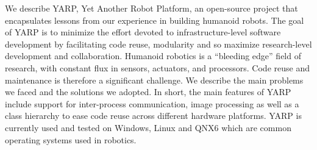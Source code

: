 
We describe YARP, Yet Another Robot Platform, an open-source project
that encapsulates lessons from our experience in building humanoid
robots.  The goal of YARP is to minimize the effort
devoted to infrastructure-level software development
 by facilitating code reuse, 
modularity and so maximize research-level development and collaboration. Humanoid robotics is a ``bleeding edge'' field of research, with constant flux in sensors, actuators, and 
processors.  Code reuse and maintenance is therefore a significant 
challenge. We describe the main problems we faced and the 
solutions we adopted. 
In short, the main features of YARP include support for inter-process
communication, image processing as well as a class hierarchy
to ease code reuse across different hardware platforms. YARP
is currently used and tested on Windows, Linux and QNX6 which are common 
operating systems used in robotics. 

